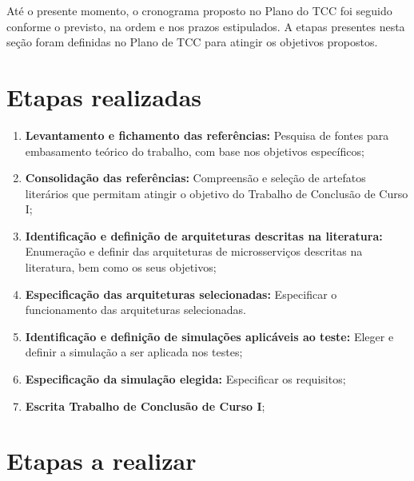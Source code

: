 Até o presente momento, o cronograma proposto no Plano do TCC foi seguido conforme o previsto, na ordem e nos prazos estipulados.
%
A etapas presentes nesta seção foram definidas no Plano de TCC para atingir os objetivos propostos.



\section{Etapas realizadas}



\begin{enumerate}
  \item \textbf{Levantamento e fichamento das referências:} Pesquisa de fontes para embasamento teórico do trabalho, com base nos objetivos específicos;

  \item \textbf{Consolidação das referências:} Compreensão e seleção de artefatos literários que permitam atingir o objetivo do Trabalho de Conclusão de Curso I;

  \item \textbf{Identificação e definição de arquiteturas descritas na literatura:} Enumeração e definir das arquiteturas de microsserviços descritas na literatura, bem como os seus objetivos;

  \item \textbf{Especificação das arquiteturas selecionadas:} Especificar o funcionamento das arquiteturas selecionadas.

  \item \textbf{Identificação e definição de simulações aplicáveis ao teste:} Eleger e definir a simulação a ser aplicada nos testes;

  \item \textbf{Especificação da simulação elegida:} Especificar os requisitos;

  \item \textbf{Escrita Trabalho de Conclusão de Curso I};
\end{enumerate}



\section{Etapas a realizar}



